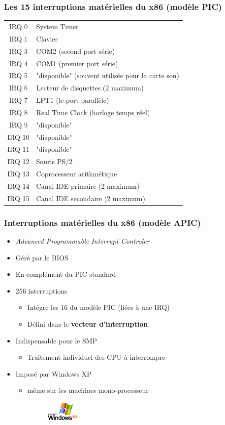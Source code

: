 \begin{frame}
 \frametitle{Les 15 interruptions matérielles du x86 (modèle PIC)}
 \begin{small}
 \begin{tabular}{c|l}
  IRQ 0 & System Timer \\
  IRQ 1 & Clavier \\
  IRQ 3 & COM2 (second port série) \\
  IRQ 4 & COM1 (premier port série) \\
  IRQ 5 &  "disponible" (souvent utilisée pour la carte son) \\
  IRQ 6 & Lecteur de disquettes (2 maximum) \\
  IRQ 7 & LPT1 (le port parallèle) \\
  IRQ 8 & Real Time Clock (horloge temps réel) \\
  IRQ 9 &  "disponible" \\
  IRQ 10 & "disponible" \\
  IRQ 11 & "disponible" \\
  IRQ 12 & Souris PS/2 \\
  IRQ 13 & Coprocesseur arithmétique \\
  IRQ 14 & Canal IDE primaire (2 maximum) \\
  IRQ 15 & Canal IDE secondaire (2 maximum)
 \end{tabular}
\end{small}
\end{frame}
 
\begin{frame}
\frametitle{Interruptions matérielles du x86 (modèle APIC)}
\begin{itemize}
\item \textit{Advanced Programmable Interrupt Controler}
\item Géré par le BIOS
\item En complément du PIC standard
\item 256 interruptions
\begin{itemize}
\item Intègre les 16 du modèle PIC (liées à une IRQ)
\item Défini dans le \textbf{vecteur d'interruption}
\end{itemize}
\item Indispensable pour le SMP
\begin{itemize}
\item Traitement individuel des CPU à interrompre
\end{itemize}
\item Imposé par Windows XP
\begin{itemize}
\item même sur les machines mono-processeur
\begin{figure}[b!]
\includegraphics[height=1cm]{../illustration/logo_windowsXP.png}
\end{figure}
\end{itemize}
\end{itemize}
\end{frame}

